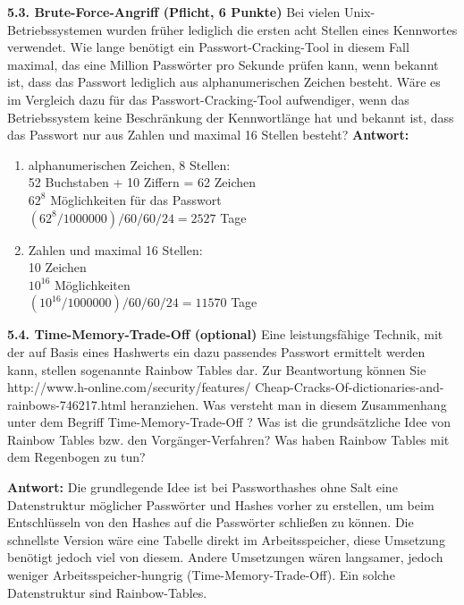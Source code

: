 \documentclass[ngerman]{fbi-aufgabenblatt}
\begin{document}
\textbf{5.3. Brute-Force-Angriff (Pflicht, 6 Punkte)}
Bei vielen Unix-Betriebssystemen wurden früher lediglich die ersten acht Stellen eines Kennwortes verwendet. Wie lange benötigt ein Passwort-Cracking-Tool in diesem Fall maximal, das eine Million Passwörter pro Sekunde prüfen kann, wenn bekannt ist, dass das Passwort lediglich aus alphanumerischen Zeichen besteht. Wäre es im Vergleich dazu für das Passwort-Cracking-Tool aufwendiger, wenn das Betriebssystem keine Beschränkung der Kennwortlänge hat und bekannt ist, dass das Passwort nur aus Zahlen und maximal 16 Stellen besteht?
\textbf{Antwort:}
\begin{enumerate}
\item alphanumerischen Zeichen, 8 Stellen:\\
       52 Buchstaben + 10 Ziffern = 62 Zeichen\\
       $62^{8}$ Möglichkeiten für das Passwort\\
       $(62^{8}/1000000)/60/60/24 = 2527$ Tage\\
\item Zahlen und maximal 16 Stellen:\\
       10 Zeichen\\
       $10^{16}$ Möglichkeiten\\
       $(10^{16}/1000000)/60/60/24 = 11570$ Tage\\
\end{enumerate}
 

\textbf{5.4. Time-Memory-Trade-Off (optional)}                                                                                                                                                                                                                                                                                                                                                                                                                                    
Eine leistungsfähige Technik, mit der auf Basis eines Hashwerts ein dazu passendes Passwort ermittelt werden kann, stellen sogenannte Rainbow Tables dar. Zur Beantwortung können Sie http://www.h-online.com/security/features/
Cheap-Cracks-Of-dictionaries-and-rainbows-746217.html heranziehen.
Was versteht man in diesem Zusammenhang unter dem Begriff Time-Memory-Trade-Off ?
Was ist die grundsätzliche Idee von Rainbow Tables bzw. den Vorgänger-Verfahren? Was haben Rainbow Tables mit dem Regenbogen zu tun?

\textbf{Antwort:}
Die grundlegende Idee ist bei Passworthashes ohne Salt eine Datenstruktur möglicher Passwörter und Hashes vorher zu erstellen, um beim Entschlüsseln von den Hashes auf die Passwörter schließen zu können. Die schnellste Version wäre eine Tabelle direkt im Arbeitsspeicher, diese Umsetzung benötigt jedoch viel von diesem. Andere Umsetzungen wären langsamer, jedoch weniger Arbeitsspeicher-hungrig (Time-Memory-Trade-Off). Ein solche Datenstruktur sind Rainbow-Tables.
\end{document}
